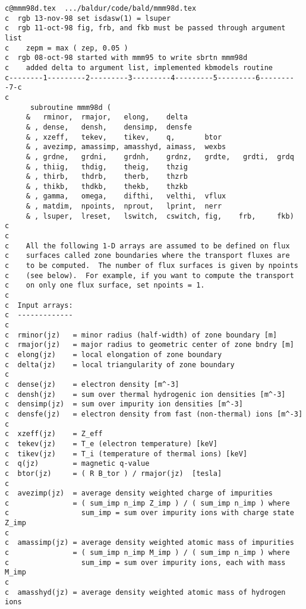 \begin{verbatim}
c@mmm98d.tex  .../baldur/code/bald/mmm98d.tex
c  rgb 13-nov-98 set isdasw(1) = lsuper
c  rgb 11-oct-98 fig, frb, and fkb must be passed through argument list
c    zepm = max ( zep, 0.05 )
c  rgb 08-oct-98 started with mmm95 to write sbrtn mmm98d
c    added delta to argument list, implemented kbmodels routine
c--------1---------2---------3---------4---------5---------6---------7-c
c
      subroutine mmm98d (
     &   rminor,  rmajor,   elong,    delta
     & , dense,   densh,    densimp,  densfe
     & , xzeff,   tekev,    tikev,    q,       btor
     & , avezimp, amassimp, amasshyd, aimass,  wexbs
     & , grdne,   grdni,    grdnh,    grdnz,   grdte,   grdti,  grdq
     & , thiig,   thdig,    theig,    thzig
     & , thirb,   thdrb,    therb,    thzrb
     & , thikb,   thdkb,    thekb,    thzkb
     & , gamma,   omega,    difthi,   velthi,  vflux
     & , matdim,  npoints,  nprout,   lprint,  nerr
     & , lsuper,  lreset,   lswitch,  cswitch, fig,    frb,     fkb)
c
c
c    All the following 1-D arrays are assumed to be defined on flux
c    surfaces called zone boundaries where the transport fluxes are
c    to be computed.  The number of flux surfaces is given by npoints
c    (see below).  For example, if you want to compute the transport
c    on only one flux surface, set npoints = 1.
c
c  Input arrays:
c  -------------
c
c  rminor(jz)   = minor radius (half-width) of zone boundary [m]
c  rmajor(jz)   = major radius to geometric center of zone bndry [m]
c  elong(jz)    = local elongation of zone boundary
c  delta(jz)    = local triangularity of zone boundary
c
c  dense(jz)    = electron density [m^-3]
c  densh(jz)    = sum over thermal hydrogenic ion densities [m^-3]
c  densimp(jz)  = sum over impurity ion densities [m^-3]
c  densfe(jz)   = electron density from fast (non-thermal) ions [m^-3]
c
c  xzeff(jz)    = Z_eff
c  tekev(jz)    = T_e (electron temperature) [keV] 
c  tikev(jz)    = T_i (temperature of thermal ions) [keV]
c  q(jz)        = magnetic q-value
c  btor(jz)     = ( R B_tor ) / rmajor(jz)  [tesla]
c
c  avezimp(jz)  = average density weighted charge of impurities
c               = ( sum_imp n_imp Z_imp ) / ( sum_imp n_imp ) where
c                 sum_imp = sum over impurity ions with charge state Z_imp
c
c  amassimp(jz) = average density weighted atomic mass of impurities
c               = ( sum_imp n_imp M_imp ) / ( sum_imp n_imp ) where 
c                 sum_imp = sum over impurity ions, each with mass M_imp
c
c  amasshyd(jz) = average density weighted atomic mass of hydrogen ions

\end{verbatim}
